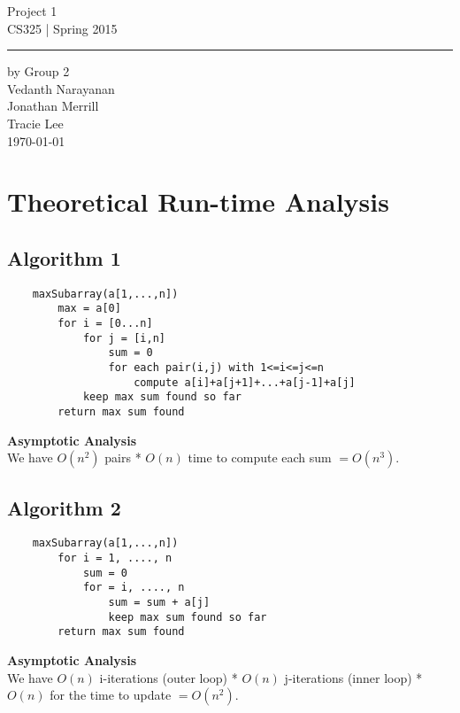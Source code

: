 \documentclass[11pt,letterpaper]{article}
\begin{document}
\begin{titlepage}
    \vspace*{4cm}
    \begin{flushright}
    {\huge
        Project 1\\[5mm]
    }
    {\large
        CS325 | Spring 2015
     }
    \end{flushright}
\hrule
    \begin{flushright}
	by Group 2\\
	Vedanth Narayanan\\
	Jonathan Merrill\\
	Tracie Lee\\
    \vfill
	\today\\
    \end{flushright}
\end{titlepage}

\raggedright

\section{Theoretical Run-time Analysis}

\subsection{Algorithm 1}
\begin{verbatim}
    maxSubarray(a[1,...,n])
        max = a[0]
        for i = [0...n]
            for j = [i,n]
                sum = 0
                for each pair(i,j) with 1<=i<=j<=n
        	        compute a[i]+a[j+1]+...+a[j-1]+a[j]
            keep max sum found so far
        return max sum found
\end{verbatim}
\textbf{Asymptotic Analysis}\\
We have $O(n^2)$ pairs * $O(n)$ time to compute each sum $= O(n^3)$.

\subsection{Algorithm 2}
\begin{verbatim}
    maxSubarray(a[1,...,n])
        for i = 1, ...., n
            sum = 0
            for = i, ...., n
                sum = sum + a[j]
                keep max sum found so far
        return max sum found
\end{verbatim}
\textbf{Asymptotic Analysis}\\
We have $O(n)$ i-iterations (outer loop) * $O(n)$ j-iterations (inner loop) * $O(n)$ for the time to update $= O(n^2)$.
\end{document}
